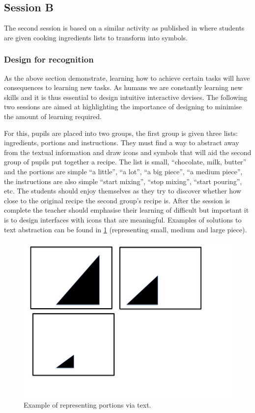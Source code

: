 \documentclass{sig-alternate}
\begin{document}
\subsection{Session B}

The second session is based on a similar activity as published in
\cite{fellows2005} where students are given cooking ingredients lists
to transform into symbols.

\subsubsection*{Design for recognition}
 
As the above section demonstrate, learning how to achieve certain
tasks will have consequences to learning new tasks. As humans we are
constantly learning new skills and it is thus essential to design
intuitive interactive devises. The following two sessions are aimed at
highlighting the importance of designing to minimise the amount of
learning required.

For this, pupils are placed into two groups, the first group is given
three lists: ingredients, portions and instructions. They must find a
way to abstract away from the textual information and draw icons and
symbols that will aid the second group of pupils put together a
recipe. The list is small, ``chocolate, milk, butter'' and the portions
are simple ``a little'', ``a lot'', ``a big piece'', ``a medium piece'', the
instructions are also simple ``start mixing'', ``stop mixing'', ``start
pouring'', etc. The students should enjoy themselves as they try to
discover whether how close to the original recipe the second group's
recipe is. After the session is complete the teacher should emphasise
their learning of difficult but important it is to design interfaces
with icons that are meaningful. Examples of solutions to text
abstraction can be found in \ref{fig1} (representing small, medium
and large piece).


\begin{figure}
  \includegraphics[width=\columnwidth]{images/portions.jpg}
  \caption{Example of representing portions via text.}\label{fig1}
\end{figure}
\end{document}
